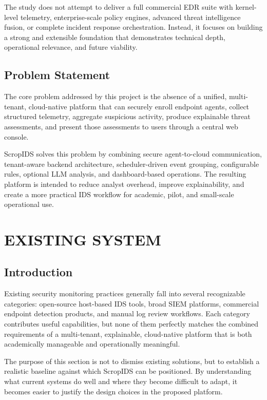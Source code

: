 \documentclass[12pt,a4paper]{article}
\begin{document}
The study does not attempt to deliver a full commercial EDR suite with kernel-level telemetry, enterprise-scale policy engines, advanced threat intelligence fusion, or complete incident response orchestration. Instead, it focuses on building a strong and extensible foundation that demonstrates technical depth, operational relevance, and future viability.

\subsection{Problem Statement}
The core problem addressed by this project is the absence of a unified, multi-tenant, cloud-native platform that can securely enroll endpoint agents, collect structured telemetry, aggregate suspicious activity, produce explainable threat assessments, and present those assessments to users through a central web console.

ScropIDS solves this problem by combining secure agent-to-cloud communication, tenant-aware backend architecture, scheduler-driven event grouping, configurable rules, optional LLM analysis, and dashboard-based operations. The resulting platform is intended to reduce analyst overhead, improve explainability, and create a more practical IDS workflow for academic, pilot, and small-scale operational use.

\clearpage
\section{EXISTING SYSTEM}

\subsection{Introduction}
Existing security monitoring practices generally fall into several recognizable categories: open-source host-based IDS tools, broad SIEM platforms, commercial endpoint detection products, and manual log review workflows. Each category contributes useful capabilities, but none of them perfectly matches the combined requirements of a multi-tenant, explainable, cloud-native platform that is both academically manageable and operationally meaningful.

The purpose of this section is not to dismiss existing solutions, but to establish a realistic baseline against which ScropIDS can be positioned. By understanding what current systems do well and where they become difficult to adapt, it becomes easier to justify the design choices in the proposed platform.
\end{document}
